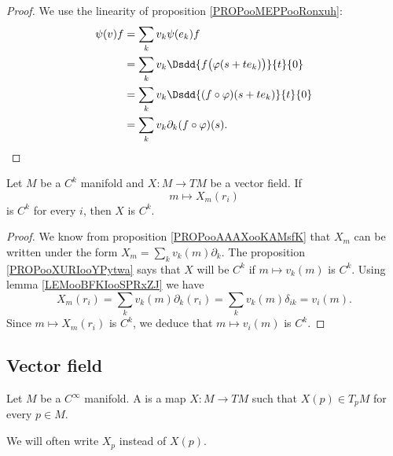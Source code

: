 \begin{proof}
	We use the linearity of proposition \ref{PROPooMEPPooRonxuh}:
	\begin{subequations}
		\begin{align}
			\psi(v)f & =\sum_kv_k\psi(e_k)f                                  \\
			         & =\sum_kv_k\Dsdd{ f\big( \varphi(s+te_k) \big) }{t}{0} \\
			         & =\sum_kv_k\Dsdd{ (f\circ\varphi)(s+te_k) }{t}{0}      \\
			         & =\sum_kv_k\partial_k(f\circ\varphi)(s).
		\end{align}
	\end{subequations}
\end{proof}


\begin{proposition}	\label{PROPooYGHAooWOXbRu}
	Let \( M\) be a \( C^k\) manifold and \(X \colon M\to TM  \) be a vector field. If
	\begin{equation}
		m\mapsto X_m(r_i)
	\end{equation}
	is \( C^k\) for every \( i\), then \( X\) is \( C^k\).
\end{proposition}

\begin{proof}
	We know from proposition \ref{PROPooAAAXooKAMsfK} that \( X_m\) can be written under the form \( X_m=\sum_kv_k(m)\partial_k\). The proposition \ref{PROPooXURIooYPytwa} says that \( X\) will be \( C^k\) if \( m\mapsto v_k(m)\) is \( C^k\). Using lemma \ref{LEMooBFKIooSPRxZJ} we have
	\begin{equation}
		X_m(r_i)=\sum_kv_k(m)\partial_k(r_i)=\sum_kv_k(m)\delta_{ik}=v_i(m).
	\end{equation}
	Since \( m\mapsto X_m(r_i)\) is \( C^k\), we deduce that \( m\mapsto v_i(m)\) is \( C^k\).
\end{proof}

\subsection{Vector field}

\begin{definition}        \label{DEFooAATTooLhNqDb}
	Let \( M\) be a \(  C^{\infty}\) manifold. A  is a map \( X\colon M\to TM\) such that \( X(p)\in T_pM\) for every \( p\in M\).

	We will often write \( X_p\) instead of \( X(p)\).
\end{definition}

